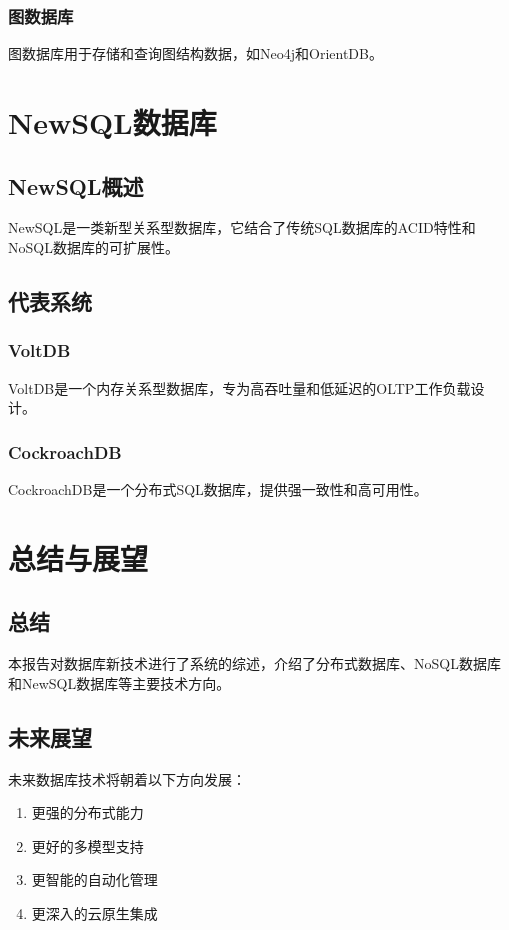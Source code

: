 \documentclass{report-uestc}
\begin{document}
\subsection{图数据库}

图数据库用于存储和查询图结构数据，如Neo4j和OrientDB。

\chapter{NewSQL数据库}

\section{NewSQL概述}

NewSQL是一类新型关系型数据库，它结合了传统SQL数据库的ACID特性和NoSQL数据库的可扩展性。

\section{代表系统}

\subsection{VoltDB}

VoltDB是一个内存关系型数据库，专为高吞吐量和低延迟的OLTP工作负载设计。

\subsection{CockroachDB}

CockroachDB是一个分布式SQL数据库，提供强一致性和高可用性。

\chapter{总结与展望}

\section{总结}

本报告对数据库新技术进行了系统的综述，介绍了分布式数据库、NoSQL数据库和NewSQL数据库等主要技术方向。

\section{未来展望}

未来数据库技术将朝着以下方向发展：
\begin{enumerate}
\item 更强的分布式能力
\item 更好的多模型支持
\item 更智能的自动化管理
\item 更深入的云原生集成
\end{enumerate}

\nocite{*}
\end{document}
